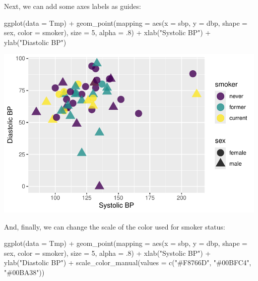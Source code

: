 \documentclass[
  letterpaper,
  DIV=11,
  numbers=noendperiod]{scrreprt}
\newenvironment{Shaded}{\begin{snugshade}}{\end{snugshade}}
\newcommand{\AttributeTok}[1]{\textcolor[rgb]{0.40,0.45,0.13}{#1}}
\newcommand{\DecValTok}[1]{\textcolor[rgb]{0.68,0.00,0.00}{#1}}
\newcommand{\FunctionTok}[1]{\textcolor[rgb]{0.28,0.35,0.67}{#1}}
\newcommand{\NormalTok}[1]{\textcolor[rgb]{0.00,0.23,0.31}{#1}}
\newcommand{\SpecialCharTok}[1]{\textcolor[rgb]{0.37,0.37,0.37}{#1}}
\newcommand{\StringTok}[1]{\textcolor[rgb]{0.13,0.47,0.30}{#1}}
\begin{document}
Next, we can add some axes labels as guides:

\begin{Shaded}
\begin{Highlighting}[]
\FunctionTok{ggplot}\NormalTok{(}\AttributeTok{data =}\NormalTok{ Tmp) }\SpecialCharTok{+}
  \FunctionTok{geom\_point}\NormalTok{(}\AttributeTok{mapping =} \FunctionTok{aes}\NormalTok{(}\AttributeTok{x =}\NormalTok{ sbp, }\AttributeTok{y =}\NormalTok{ dbp, }\AttributeTok{shape =}\NormalTok{ sex, }\AttributeTok{color =}\NormalTok{ smoker), }\AttributeTok{size =} \DecValTok{5}\NormalTok{, }\AttributeTok{alpha =}\NormalTok{ .}\DecValTok{8}\NormalTok{) }\SpecialCharTok{+}
  \FunctionTok{xlab}\NormalTok{(}\StringTok{"Systolic BP"}\NormalTok{) }\SpecialCharTok{+} \FunctionTok{ylab}\NormalTok{(}\StringTok{"Diastolic BP"}\NormalTok{)}
\end{Highlighting}
\end{Shaded}

\includegraphics{src/02-Intro_Data_Viz_files/figure-pdf/unnamed-chunk-6-1.pdf}

And, finally, we can change the scale of the color used for smoker
status:

\begin{Shaded}
\begin{Highlighting}[]
\FunctionTok{ggplot}\NormalTok{(}\AttributeTok{data =}\NormalTok{ Tmp) }\SpecialCharTok{+}
  \FunctionTok{geom\_point}\NormalTok{(}\AttributeTok{mapping =} \FunctionTok{aes}\NormalTok{(}\AttributeTok{x =}\NormalTok{ sbp, }\AttributeTok{y =}\NormalTok{ dbp, }\AttributeTok{shape =}\NormalTok{ sex, }\AttributeTok{color =}\NormalTok{ smoker), }\AttributeTok{size =} \DecValTok{5}\NormalTok{, }\AttributeTok{alpha =}\NormalTok{ .}\DecValTok{8}\NormalTok{) }\SpecialCharTok{+}
  \FunctionTok{xlab}\NormalTok{(}\StringTok{"Systolic BP"}\NormalTok{) }\SpecialCharTok{+} \FunctionTok{ylab}\NormalTok{(}\StringTok{"Diastolic BP"}\NormalTok{) }\SpecialCharTok{+}
  \FunctionTok{scale\_color\_manual}\NormalTok{(}\AttributeTok{values =} \FunctionTok{c}\NormalTok{(}\StringTok{"\#F8766D"}\NormalTok{, }\StringTok{"\#00BFC4"}\NormalTok{, }\StringTok{"\#00BA38"}\NormalTok{))}
\end{Highlighting}
\end{Shaded}
\end{document}
